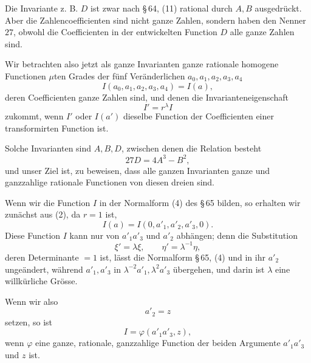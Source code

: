 \documentclass[11pt]{article}
\begin{document}
Die Invariante z. B. $D$ ist zwar nach \S\,64, (11) rational durch $A,B$ ausgedrückt. Aber die Zahlencoefficienten sind nicht ganze Zahlen, sondern haben den Nenner $27$, obwohl die Coefficienten in der entwickelten Function $D$ alle ganze Zahlen sind.

Wir betrachten also jetzt als ganze Invarianten ganze rationale homogene Functionen $\mu$ten Grades der fünf Veränderlichen $a_0,a_1,a_2,a_3,a_4$
\begin{equation}
 I(a_0,a_1,a_2,a_3,a_4)=I(a),
\tag{1}
\end{equation}
deren Coefficienten ganze Zahlen sind, und denen die Invarianteneigenschaft
\begin{equation}
 I'=r^\lambda I
\tag{2}
\end{equation}
zukommt, wenn $I'$ oder $I(a')$ dieselbe Function der Coefficienten einer transformirten Function ist.

Solche Invarianten sind $A,B,D$, zwischen denen die Relation besteht
\begin{equation}
 27D=4A^3-B^2,
\tag{3}
\end{equation}
und unser Ziel ist, zu beweisen, dass alle ganzen Invarianten ganze und ganzzahlige rationale Functionen von diesen dreien sind.

Wenn wir die Function $I$ in der Normalform (4) des \S\,65 bilden, so erhalten wir zunächst aus (2), da $r=1$ ist,
\[
 I(a)=I(0,a'_1,a'_2,a'_3,0).
\]
Diese Function $I$ kann nur von $a'_1a'_3$ und $a'_2$ abhängen; denn die Substitution
\[
 \xi'=\lambda\xi,
 \qquad
 \eta'=\lambda^{-1}\eta,
\]
deren Determinante $=1$ ist, lässt die Normalform \S\,65, (4) und in ihr $a'_2$ ungeändert, während $a'_1,a'_3$ in $\lambda^{-2}a'_1,\lambda^2a'_3$ übergehen, und darin ist $\lambda$ eine willkürliche Grösse.

Wenn wir also
\[
 a'_2=z
\]
setzen, so ist
\begin{equation}
 I=\varphi(a'_1a'_3,z),
\tag{4}
\end{equation}
wenn $\varphi$ eine ganze, rationale, ganzzahlige Function der beiden Argumente $a'_1a'_3$ und $z$ ist.
\end{document}
